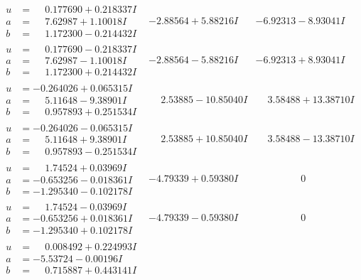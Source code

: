 \documentclass[1p]{elsarticle_modified}
\theoremstyle{definition}
\begin{document}
$$\begin{array}{c|c|c}
\begin{aligned}
u &= \phantom{-}0.177690 + 0.218337 I \\
a &= \phantom{-}7.62987 + 1.10018 I \\
b &= \phantom{-}1.172300 - 0.214432 I\end{aligned}
 & -2.88564 + 5.88216 I & -6.92313 - 8.93041 I \\ \hline\begin{aligned}
u &= \phantom{-}0.177690 - 0.218337 I \\
a &= \phantom{-}7.62987 - 1.10018 I \\
b &= \phantom{-}1.172300 + 0.214432 I\end{aligned}
 & -2.88564 - 5.88216 I & -6.92313 + 8.93041 I \\ \hline\begin{aligned}
u &= -0.264026 + 0.065315 I \\
a &= \phantom{-}5.11648 - 9.38901 I \\
b &= \phantom{-}0.957893 + 0.251534 I\end{aligned}
 & \phantom{-}2.53885 - 10.85040 I & \phantom{-}3.58488 + 13.38710 I \\ \hline\begin{aligned}
u &= -0.264026 - 0.065315 I \\
a &= \phantom{-}5.11648 + 9.38901 I \\
b &= \phantom{-}0.957893 - 0.251534 I\end{aligned}
 & \phantom{-}2.53885 + 10.85040 I & \phantom{-}3.58488 - 13.38710 I \\ \hline\begin{aligned}
u &= \phantom{-}1.74524 + 0.03969 I \\
a &= -0.653256 - 0.018361 I \\
b &= -1.295340 - 0.102178 I\end{aligned}
 & -4.79339 + 0.59380 I & \phantom{-0.000000 } 0 \\ \hline\begin{aligned}
u &= \phantom{-}1.74524 - 0.03969 I \\
a &= -0.653256 + 0.018361 I \\
b &= -1.295340 + 0.102178 I\end{aligned}
 & -4.79339 - 0.59380 I & \phantom{-0.000000 } 0 \\ \hline\begin{aligned}
u &= \phantom{-}0.008492 + 0.224993 I \\
a &= -5.53724 - 0.00196 I \\
b &= \phantom{-}0.715887 + 0.443141 I\end{aligned}

\end{array}$$
\end{document}
